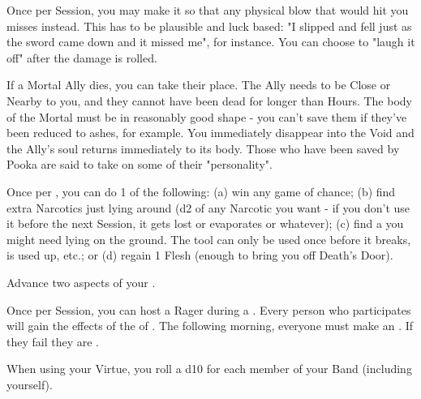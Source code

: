 \begin{multicols*}{2}

Once per Session, you may make it so that any physical blow that would hit you misses instead.  This has to be plausible and luck based: "I slipped and fell just as the sword came down and it missed me", for instance.  You can choose to "laugh it off" after the damage is rolled.


If a Mortal Ally dies, you can take their place.  The Ally needs to be Close or Nearby to you, and they cannot have been dead for longer than Hours.  The body of the Mortal must be in reasonably good shape - you can't save them if they've been reduced to ashes, for example.  You immediately disappear into the Void and the Ally's soul returns immediately to its body. Those who have been saved by Pooka are said to take on some of their "personality".

\cbreak


 Once per , you can do 1 of the following:  (a) win any game of chance; (b) find extra Narcotics just lying around (d2 \UD of any Narcotic you want - if you don't use it before the next Session, it gets lost or evaporates or whatever); (c) find a  you might need lying on the ground. The tool can only be used once before it breaks, is used up, etc.; or (d) regain 1 Flesh (enough to bring you off Death's Door).




Advance two  aspects of your  \DCUP.


Once per Session, you can host a Rager during a .  Every person who participates will gain the effects of the  of . The following morning, everyone must make an \RSTRY{\VIG}. If they fail they are .

\newpage


When using your  Virtue, you roll a d10 for each member of your Band (including yourself).


\end{multicols*}
